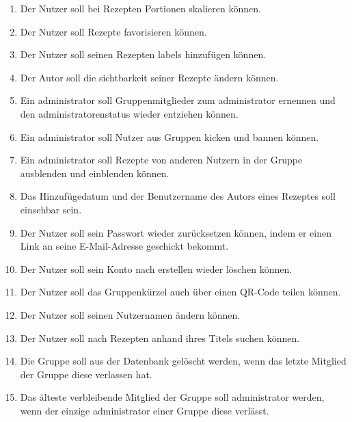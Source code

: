 \documentclass[parskip=full]{scrartcl}
\begin{document}
\begin{enumerate}[start=1,label={$\langle$\bfseries RS\arabic*$\rangle$}, leftmargin = 5em, itemsep=4pt, parsep=4pt]
    \item Der Nutzer soll bei Rezepten Portionen skalieren können.\label{rs:PortionScaling}
    \item Der Nutzer soll Rezepte favorisieren können.\label{rs:RecipeFavourites}
    \item Der Nutzer soll seinen Rezepten \Gls{labels} hinzufügen können.\label{rs:RecipeLabels}
    \item Der Autor soll die \Gls{sichtbarkeit} seiner Rezepte ändern können.\label{rs:RecipeVisibility}
    \item Ein \Gls{administrator} soll Gruppenmitglieder zum \Gls{administrator} ernennen und den \Gls{administrator}enstatus wieder entziehen können.\label{rs:AdminCreation}
    \item Ein \Gls{administrator} soll Nutzer aus Gruppen \gls{kicken} und \gls{bannen} können.\label{rs:Kicking}
    \item Ein \Gls{administrator} soll Rezepte von anderen Nutzern in der Gruppe \gls{ausblenden} und \gls{einblenden} können.\label{rs:RecipeHiding}
    \item Das Hinzufügedatum und der Benutzername des Autors eines Rezeptes soll einsehbar sein.\label{rs:AuthorAndDate}
    \item Der Nutzer soll sein Passwort wieder zurücksetzen können, indem er einen Link an seine E-Mail-Adresse geschickt bekommt.\label{rs:ResetPassword}
    \item Der Nutzer soll sein Konto nach erstellen wieder löschen können.\label{rs:AccountDeletion}
    \item Der Nutzer soll das Gruppenkürzel auch über einen QR-Code teilen können.\label{rs:QRCode}
    \item Der Nutzer soll seinen Nutzernamen ändern können.\label{rs:ChangeUsername}
    \item Der Nutzer soll nach Rezepten anhand ihres Titels suchen können.\label{rs:Searching}
    \item Die Gruppe soll aus der Datenbank gelöscht werden, wenn das letzte Mitglied der Gruppe diese verlassen hat.\label{rs:EmptyGroup}
    \item Das älteste verbleibende Mitglied der Gruppe soll \Gls{administrator} werden, wenn der einzige \Gls{administrator} einer Gruppe diese verlässt.\label{rs:NoAdmins}

\end{enumerate}
\end{document}
